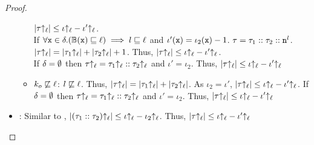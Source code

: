 \begin{proof}
\begin{itemize}[leftmargin=.5in]
\begin{itemize}
        $|\tau{\uparrow_\ell}| \leq \iota{\uparrow_\ell} - \iota'{\uparrow_\ell}$. \\ If 
        $\forall \texttt{x} \in \delta. (\mathbb{B}(\texttt{x}) \sqsubseteq \ell)
        \implies l \sqsubseteq \ell$ and $\iota'(\texttt{x}) = \iota_2(\texttt{x})
        - 1$. $\tau = \tau_1 :: \tau_2 :: \texttt{n}^l$. $|\tau{\uparrow_\ell}| =
        |\tau_1{\uparrow_\ell}| + |\tau_2{\uparrow_\ell}| + 1$. Thus, $|\tau{\uparrow_\ell}|
        \leq \iota{\uparrow_\ell} - \iota'{\uparrow_\ell}$. \\ If $\delta = \emptyset$ then
        $\tau{\uparrow_\ell} = \tau_1{\uparrow_\ell} ::\tau_2{\uparrow_\ell}$ and $\iota' =
        \iota_2$. Thus, $|\tau{\uparrow_\ell}| \leq \iota{\uparrow_\ell} - \iota'{\uparrow_\ell}$ 
      \item $k_o \not\sqsubseteq \ell$: $l \not\sqsubseteq
        \ell$. Thus, $|\tau{\uparrow_\ell}| =
        |\tau_1{\uparrow_\ell}| + |\tau_2{\uparrow_\ell}|$. As $\iota_2 = \iota'$,
        $|\tau{\uparrow_\ell}| \leq \iota{\uparrow_\ell} - \iota'{\uparrow_\ell}$. If 
        $\delta = \emptyset$ then 
        $\tau{\uparrow_\ell} = \tau_1{\uparrow_\ell} ::\tau_2{\uparrow_\ell}$ and $\iota' =
        \iota_2$. Thus, $|\tau{\uparrow_\ell}| \leq \iota{\uparrow_\ell} - \iota'{\uparrow_\ell}$
    \end{itemize}
  \item{}: Similar to , $|(\tau_1::\tau_2){\uparrow_\ell}| \leq \iota{\uparrow_\ell} -
    \iota_2{\uparrow_\ell}$. Thus, $|\tau{\uparrow_\ell}| \leq \iota{\uparrow_\ell} - \iota'{\uparrow_\ell}$
  \end{itemize}
\end{proof}

